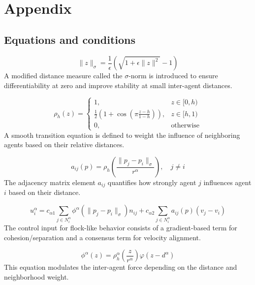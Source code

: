 \documentclass[conference]{IEEEtran}
\begin{document}
\section*{Appendix}

\subsection*{Equations and conditions}
\begin{equation}
\| z \|_{\sigma} = \frac{1}{\epsilon} \left( \sqrt{1 + \epsilon \| z \|^2} - 1 \right)
\label{eq:16}
\end{equation}
A modified distance measure called the $\sigma$-norm is introduced to ensure differentiability at zero and improve stability at small inter-agent distances.

\begin{equation}
\rho_h(z) =
\begin{cases}
1, & z \in [0, h) \\
\frac{1}{2} \left( 1 + \cos \left( \pi \frac{z - h}{1 - h} \right) \right), & z \in [h, 1) \\
0, & \text{otherwise}
\end{cases}
\label{eq:17}
\end{equation}
A smooth transition equation is defined to weight the influence of neighboring agents based on their relative distances.

\begin{equation}
a_{ij}(p) = \rho_h \left( \frac{\| p_j - p_i \|_{\sigma}}{r^{\alpha}} \right), \quad j \neq i
\label{eq:18}
\end{equation}
The adjacency matrix element $a_{ij}$ quantifies how strongly agent $j$ influences agent $i$ based on their distance.

\begin{equation}
u^{\alpha}_i = c_{\alpha 1} \sum_{j \in N^{\alpha}_i} \phi^{\alpha} \left( \| p_j - p_i \|_{\sigma} \right) n_{ij}
+ c_{\alpha 2} \sum_{j \in N^{\alpha}_i} a_{ij}(p) (v_j - v_i)
\label{eq:19}
\end{equation}
The control input for flock-like behavior consists of a gradient-based term for cohesion/separation and a consensus term for velocity alignment.

\begin{equation}
\phi^{\alpha}(z) = \rho^{\alpha}_h \left( \frac{z}{r^{\alpha}} \right) \varphi(z - d^{\alpha})
\label{eq:20}
\end{equation}
This equation modulates the inter-agent force depending on the distance and neighborhood weight.
\end{document}
